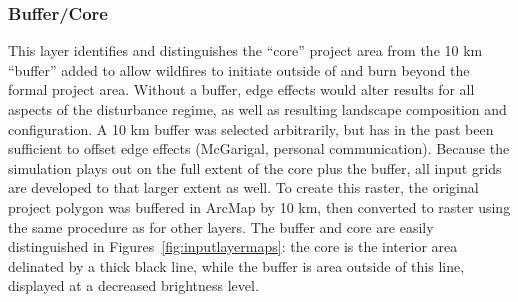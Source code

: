 \subsubsection{Buffer/Core} 
This layer identifies and distinguishes the ``core'' project area from the 10 km ``buffer'' added to allow wildfires to initiate outside of and burn beyond the formal project area. Without a buffer, edge effects would alter results for all aspects of the disturbance regime, as well as resulting landscape composition and configuration. A 10 km buffer was selected arbitrarily, but has in the past been sufficient to offset edge effects (McGarigal, personal communication). Because the simulation plays out on the full extent of the core plus the buffer, all input grids are developed to that larger extent as well. To create this raster, the original project polygon was buffered in ArcMap by 10 km, then converted to raster using the same procedure as for other layers. The buffer and core are easily distinguished in Figures~\ref{fig:inputlayermaps}: the core is the interior area delinated by a thick black line, while the buffer is area outside of this line, displayed at a decreased brightness level.

%
%
%


